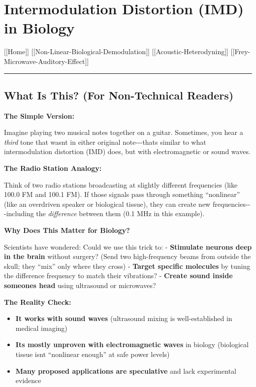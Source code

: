\section{Intermodulation Distortion (IMD) in
Biology}\label{intermodulation-distortion-imd-in-biology}

{[}{[}Home{]}{]} \textbar{}
{[}{[}Non-Linear-Biological-Demodulation{]}{]} \textbar{}
{[}{[}Acoustic-Heterodyning{]}{]} \textbar{}
{[}{[}Frey-Microwave-Auditory-Effect{]}{]}

\begin{center}\rule{0.5\linewidth}{0.5pt}\end{center}

\subsection{What Is This? (For Non-Technical
Readers)}\label{what-is-this-for-non-technical-readers}

\textbf{The Simple Version:}

Imagine playing two musical notes together on a guitar. Sometimes, you
hear a \emph{third} tone that wasn\textquotesingle t in either original
note-\/-\/-that\textquotesingle s similar to what intermodulation
distortion (IMD) does, but with electromagnetic or sound waves.

\textbf{The Radio Station Analogy:}

Think of two radio stations broadcasting at slightly different
frequencies (like 100.0 FM and 100.1 FM). If those signals pass through
something ``nonlinear'' (like an overdriven speaker or biological
tissue), they can create new frequencies-\/-\/-including the
\emph{difference} between them (0.1 MHz in this example).

\textbf{Why Does This Matter for Biology?}

Scientists have wondered: Could we use this trick to: -
\textbf{Stimulate neurons deep in the brain} without surgery? (Send two
high-frequency beams from outside the skull; they ``mix'' only where
they cross) - \textbf{Target specific molecules} by tuning the
difference frequency to match their vibrations? - \textbf{Create sound
inside someone\textquotesingle s head} using ultrasound or microwaves?

\textbf{The Reality Check:}

\begin{itemize}
\tightlist
\item
  \textbf{It works with sound waves} (ultrasound mixing is
  well-established in medical imaging)
\item
  \textbf{It\textquotesingle s mostly unproven with electromagnetic
  waves} in biology (biological tissue isn\textquotesingle t ``nonlinear
  enough'' at safe power levels)
\item
  \textbf{Many proposed applications are speculative} and lack
  experimental evidence
\end{itemize}


